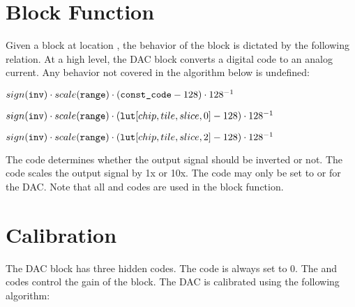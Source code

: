 \section{Block Function}\label{dac:blockfun}

Given a block at location , the behavior of the block
is dictated by the following relation. At a high level, the DAC block converts a
digital code to an analog current. Any behavior not covered in the algorithm
below is undefined:

\begin{algorithmic}

    \State $sign(\tx{inv}) \cdot scale(\tx{range}) \cdot (\tx{const_code}-128)\cdot 128^{-1}$

    \State $sign(\tx{inv}) \cdot scale(\tx{range}) \cdot (\tx{lut}\hindex{chip}{tile}{slice}{0}-128)\cdot 128^{-1}$

    \State $sign(\tx{inv}) \cdot scale(\tx{range}) \cdot (\tx{lut}\hindex{chip}{tile}{slice}{2}-128)\cdot 128^{-1}$
    \EndIf
 \EndIf
\end{algorithmic}

The  code determines whether the output signal should be inverted or
not. The  code scales the output signal by 1x or 10x. The 
code may only be set to  or  for the DAC. Note
that all \static and \dynamic codes are used in the block function.

\section{Calibration}
The DAC block has three hidden codes. The
 code is always set to $0$. The  and  codes
control the gain of the block. The DAC is calibrated using the following
algorithm:

\begin{algorithmic}
    \EndFor
  \EndFor

  \EndFor
\end{algorithmic}

